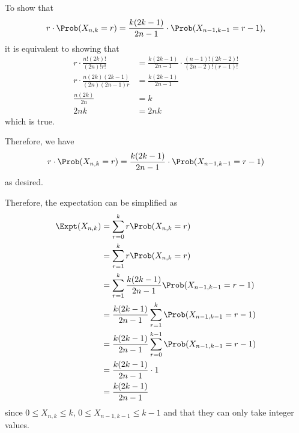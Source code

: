 \begin{enumerate}
          To show that
          \[
              r \cdot \Prob(X_{n, k} = r) = \frac{k (2k - 1)}{2n - 1} \cdot \Prob(X_{n - 1, k - 1} = r - 1),
          \]
          it is equivalent to showing that
          \begin{align*}
              r \cdot \frac{n! (2k)!}{(2n)! r! }               & = \frac{k (2k - 1)}{2n - 1} \cdot \frac{(n - 1)! (2k - 2)! }{(2n - 2)! (r - 1)!} \\
              r \cdot \frac{n (2k) (2k - 1)}{(2n) (2n - 1) r } & = \frac{k (2k - 1)}{2n - 1}                                                      \\
              \frac{n (2k)}{2n}                                & = k                                                                              \\
              2nk                                              & = 2nk
          \end{align*}
          which is true.

          Therefore, we have
          \[
              r \cdot \Prob(X_{n, k} = r) = \frac{k (2k - 1)}{2n - 1} \cdot \Prob(X_{n - 1, k - 1} = r - 1)
          \]
          as desired.

          Therefore, the expectation can be simplified as
          \begin{align*}
              \Expt(X_{n, k}) & = \sum_{r = 0}^{k} r \Prob(X_{n, k} = r)                                         \\
                              & = \sum_{r = 1}^{k} r \Prob(X_{n, k} = r)                                         \\
                              & = \sum_{r = 1}^{k} \frac{k (2k - 1)}{2n - 1} \Prob(X_{n - 1, k - 1} = r - 1)     \\
                              & = \frac{k (2k - 1)}{2n - 1} \sum_{r = 1}^{k} \Prob(X_{n - 1, k - 1} = r - 1)     \\
                              & = \frac{k (2k - 1)}{2n - 1} \sum_{r = 0}^{k - 1} \Prob(X_{n - 1, k - 1} = r - 1) \\
                              & = \frac{k (2k - 1)}{2n - 1} \cdot 1                                              \\
                              & = \frac{k (2k - 1)}{2n - 1}
          \end{align*}
          since \(0 \leq X_{n, k} \leq k\), \(0 \leq X_{n - 1, k - 1} \leq k - 1\) and that they can only take integer values.
\end{enumerate}